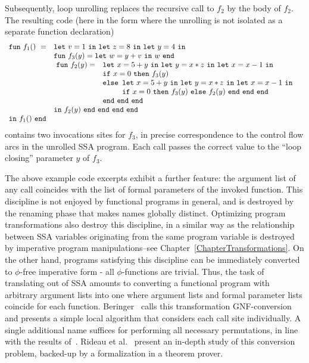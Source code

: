 Subsequently, loop unrolling replaces the recursive
call to $f_2$ by the body of $f_2$. The resulting code (here in the
form where the unrolling is not isolated as a separate function
declaration) 
$$
\begin{array}{ll}
\mathtt{fun}\ f_1()\ = & \mathtt{let}\ v = 1 \ 
                  \mathtt{in\ let}\ z = 8 \ 
                  \mathtt{in\ let}\ y = 4\ \mathtt{in}\\
& \mathtt{fun}\ f_3(y) = 
   \mathtt{let}\ w = y+v\ \mathtt{in}\ w\ \mathtt{end}\\
&\! \begin{array}{ll}
     \mathtt{fun}\ f_2(y) = &
     \mathtt{let}\ x = 5+y\
     \mathtt{in\ let}\ y = x*z\
     \mathtt{in\ let}\ x = x-1\ \mathtt{in}\\
   & \mathtt{if}\ x=0\ \mathtt{then}\ f_3(y)\\
   & \mathtt{else} 
       \begin{array}[t]{l} 
         \mathtt{let}\ x = 5+y\
         \mathtt{in\ let}\ y = x*z\
         \mathtt{in\ let}\ x = x-1\ \mathtt{in}\\
         \mathtt{if}\ x=0\ \mathtt{then}\ f_3(y)\
         \mathtt{else}\ f_2(y)\ \mathtt{end\ end\ end}
       \end{array}\\ 
   & \mathtt{end\ end\ end}
  \end{array}\\
& \mathtt{in}\ f_2(y)\ \mathtt{end\ end\ end\ end}\\
\mathtt{in}\ f_1()\  \mathtt{end}
\end{array}
$$ 
contains two invocations sites for $f_3$, in precise correspondence to
the control flow arcs in the unrolled SSA program. Each call passes
the correct value to the ``loop closing'' parameter $y$ of $f_3$.

The above example code excerpts exhibit a further feature: the
argument list of any call coincides with the list of formal parameters
of the invoked function. This discipline is not enjoyed by functional
programs in general, and is destroyed by the renaming phase that makes
names globally distinct. Optimizing program transformations also
destroy this discipline, in a similar way as the relationship between
SSA variables originating from the same program variable is destroyed
by imperative program manipulations--see
Chapter~\ref{ChapterTransformations}. On the other hand, programs
satisfying this discipline can be immediately converted to $\phi$-free
imperative form - all $\phi$-functions are trivial. Thus, the task of
translating out of SSA amounts to converting a functional program with
arbitrary argument lists into one where argument lists and formal
parameter lists coincide for each
function. Beringer~\cite{DBLP:journals/entcs/Beringer07} calls this
transformation GNF-conversion and presents a simple local algorithm
that considers each call site individually. A single additional name
suffices for performing all necessary permutations, in line with the
results of~\cite{May}. Rideau et
al.~\cite{DBLP:journals/jar/RideauSL08} present an in-depth study of
this conversion problem, backed-up by a formalization in a theorem
prover.

